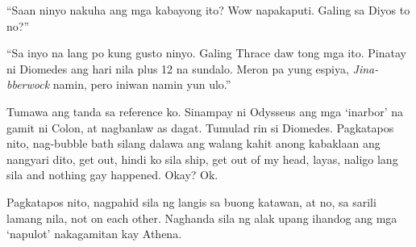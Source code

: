 \documentclass[12pt,letterpaper]{report}
\begin{document}
``Saan ninyo nakuha ang mga kabayong ito? Wow napakaputi. Galing sa Diyos to no?''

``Sa inyo na lang po kung gusto ninyo. Galing Thrace daw tong mga ito. Pinatay ni Diomedes ang hari nila plus 12 na sundalo. Meron pa yung espiya, \textit{Jina-bberwock} namin, pero iniwan namin yun ulo.''

Tumawa ang tanda sa reference ko. Sinampay ni Odysseus ang mga `inarbor' na gamit ni Colon, at nagbanlaw as dagat. Tumulad rin si Diomedes. Pagkatapos nito, nag-bubble bath silang dalawa ang walang kahit anong kabaklaan ang nangyari dito, get out, hindi ko sila ship, get out of my head, layas, naligo lang sila and nothing gay happened. Okay? Ok.

Pagkatapos nito, nagpahid sila ng langis sa buong katawan, at no, sa sarili lamang nila, not on each other. Naghanda sila ng alak upang ihandog ang mga `napulot' nakagamitan kay Athena.
\end{document}
